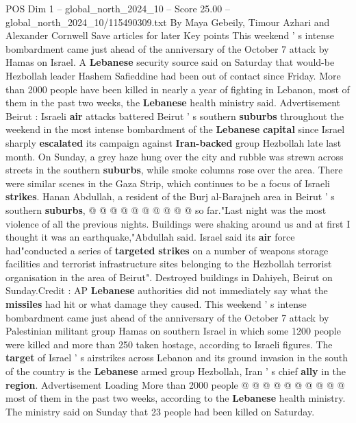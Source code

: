 \begin{textsample}{POS Dim 1 – global\_north\_2024\_10 – Score 25.00 – global\_north\_2024\_10/115490309.txt}  \label{ex:f1_pos_089}
By Maya Gebeily, Timour Azhari and Alexander Cornwell Save articles for later Key points This weekend ' s intense bombardment came just ahead of the anniversary of the October 7 attack by Hamas on Israel.
A \textbf{Lebanese} security source said on Saturday that would-be Hezbollah leader Hashem Safieddine had been out of contact since Friday.
More than 2000 people have been killed in nearly a year of fighting in Lebanon, most of them in the past two weeks, the \textbf{Lebanese} health ministry said.
Advertisement Beirut : Israeli \textbf{air} attacks battered Beirut ' s southern \textbf{suburbs} throughout the weekend in the most intense bombardment of the \textbf{Lebanese} \textbf{capital} since Israel sharply \textbf{escalated} its campaign against \textbf{Iran-backed} group Hezbollah late last month.
On Sunday, a grey haze hung over the city and rubble was strewn across streets in the southern \textbf{suburbs}, while smoke columns rose over the area.
There were similar scenes in the Gaza Strip, which continues to be a focus of Israeli \textbf{strikes}.
Hanan Abdullah, a resident of the Burj al-Barajneh area in Beirut ' s southern \textbf{suburbs}, @ @ @ @ @ @ @ @ @ @ so far."Last night was the most violence of all the previous nights.
Buildings were shaking around us and at first I thought it was an earthquake,"Abdullah said.
Israel said its \textbf{air} force had"conducted a series of \textbf{targeted} \textbf{strikes} on a number of weapons storage facilities and terrorist infrastructure sites belonging to the Hezbollah terrorist organisation in the area of Beirut".
Destroyed buildings in Dahiyeh, Beirut on Sunday.Credit : AP \textbf{Lebanese} authorities did not immediately say what the \textbf{missiles} had hit or what damage they caused.
This weekend ' s intense bombardment came just ahead of the anniversary of the October 7 attack by Palestinian militant group Hamas on southern Israel in which some 1200 people were killed and more than 250 taken hostage, according to Israeli figures.
The \textbf{target} of Israel ' s airstrikes across Lebanon and its ground invasion in the south of the country is the \textbf{Lebanese} armed group Hezbollah, Iran ' s chief \textbf{ally} in the \textbf{region}.
Advertisement Loading More than 2000 people @ @ @ @ @ @ @ @ @ @ most of them in the past two weeks, according to the \textbf{Lebanese} health ministry.
The ministry said on Sunday that 23 people had been killed on Saturday.

\end{textsample}
